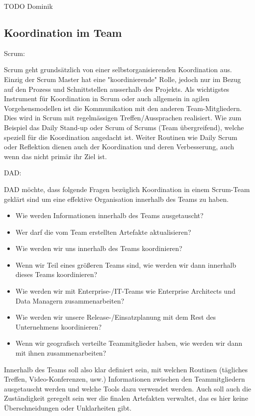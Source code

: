 TODO Dominik



\subsection{Koordination im Team}



{\Large Scrum:} \cite{planningReleaseScrum} \medskip

Scrum geht grundsätzlich von einer selbstorganisierenden Koordination aus. Einzig der Scrum Master hat eine "koordinierende" Rolle, jedoch nur im Bezug auf den Prozess und Schnittstellen ausserhalb des Projekts.
Als wichtigstes Instrument für Koordination in Scrum oder auch allgemein in agilen Vorgehensmodellen ist die Kommunikation mit den anderen Team-Mitgliedern. Dies wird in Scrum mit regelmässigen Treffen/Aussprachen realisiert. Wie zum Beispiel das Daily Stand-up oder Scrum of Scrums (Team übergreifend), welche speziell für die Koordination angedacht ist. Weiter Routinen wie Daily Scrum oder Reflektion dienen auch der Koordination und deren Verbesserung, auch wenn das nicht primär ihr Ziel ist.
\bigskip 

{\Large DAD:} \cite{planningReleaseDad} \medskip

DAD möchte, dass folgende Fragen bezüglich Koordination in einem Scrum-Team geklärt sind um eine effektive Organisation innerhalb des Teams zu haben.
\begin{itemize}
	\item 	Wie werden Informationen innerhalb des Teams ausgetauscht?
	\item 	Wer darf die vom Team erstellten Artefakte aktualisieren? 
	\item 	Wie werden wir uns innerhalb des Teams koordinieren?
	\item 	Wenn wir Teil eines größeren Teams sind, wie werden wir dann innerhalb dieses Teams koordinieren?
	\item 	Wie werden wir mit Enterprise-/IT-Teams wie Enterprise Architects und Data Managern zusammenarbeiten?
	\item 	Wie werden wir unsere Release-/Einsatzplanung mit dem Rest des Unternehmens koordinieren?
	\item 	Wenn wir geografisch verteilte Teammitglieder haben, wie werden wir dann mit ihnen zusammenarbeiten?
\end{itemize}
Innerhalb des Teams soll also klar definiert sein, mit welchen Routinen (tägliches Treffen, Video-Konferenzen, usw.) Informationen zwischen den Teammitgliedern ausgetauscht werden und welche Tools dazu verwendet werden. Auch soll auch die Zuständigkeit geregelt sein wer die finalen Artefakten verwaltet, das es hier keine Überschneidungen oder Unklarheiten gibt.
\medskip

